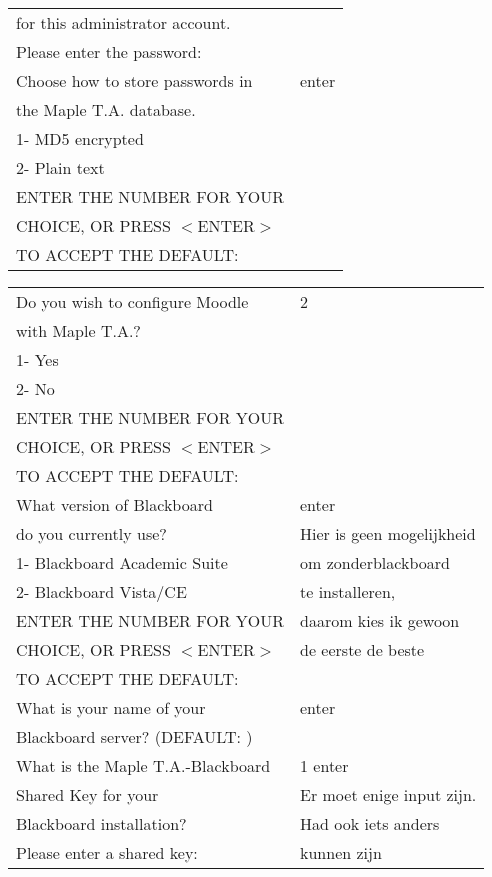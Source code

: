 \begin{enumerate}
\begin{tabular}{ | l | l |}
				 for this administrator account. &\\
				 Please enter the password: &\\
				 \hline
				 Choose how to store passwords in & enter\\
				 the Maple T.A. database. &\\
				 1- MD5 encrypted &\\
			   2- Plain text &\\
			   ENTER THE NUMBER FOR YOUR & \\
			   CHOICE, OR PRESS $<$ENTER$>$ & \\
			   TO ACCEPT THE DEFAULT: & \\
			   \hline
		\end{tabular}

		\begin{tabular}{ | l | l |}
				 \hline	
			   Do you wish to configure Moodle & 2\\
			   with Maple T.A.? &\\
				 1- Yes &\\
  			 2- No &\\
  			 ENTER THE NUMBER FOR YOUR & \\
			   CHOICE, OR PRESS $<$ENTER$>$ & \\
			   TO ACCEPT THE DEFAULT: & \\
			   \hline		   
				 What version of Blackboard & enter\\
			   do you currently use? & Hier is geen mogelijkheid  \\
				 1- Blackboard Academic Suite & om zonderblackboard  \\
				 2- Blackboard Vista/CE & te installeren,\\
				 ENTER THE NUMBER FOR YOUR & daarom kies ik gewoon\\
			   CHOICE, OR PRESS $<$ENTER$>$ & de eerste de beste\\
			   TO ACCEPT THE DEFAULT: & \\
			   \hline
			   What is your name of your & enter \\
			   Blackboard server? \quad (DEFAULT: ) &\\
			   \hline
			   What is the Maple T.A.-Blackboard & 1 enter\\
			   Shared Key for your  & Er moet enige input zijn.  \\
			   Blackboard installation? & Had ook iets anders\\
				 Please enter a shared key: &  kunnen zijn\\

\end{tabular}
\end{enumerate}
